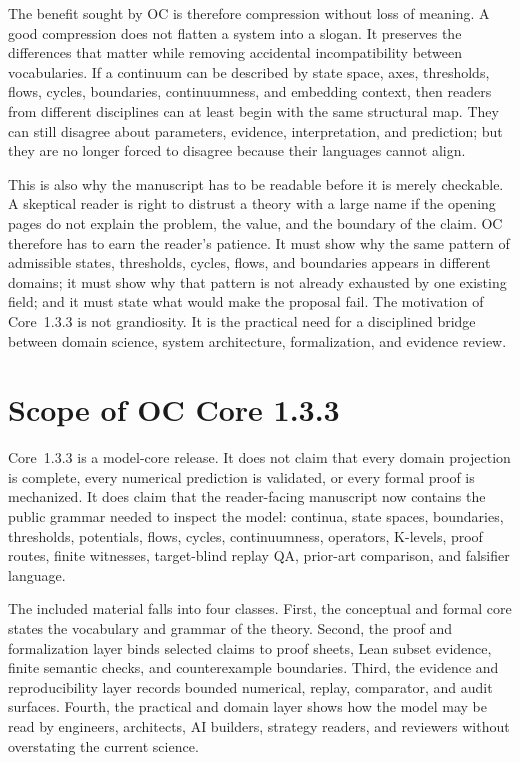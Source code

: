 The benefit sought by OC is therefore compression without loss of meaning. A
good compression does not flatten a system into a slogan. It preserves the
differences that matter while removing accidental incompatibility between
vocabularies. If a continuum can be described by state space, axes, thresholds,
flows, cycles, boundaries, continuumness, and embedding context, then readers
from different disciplines can at least begin with the same structural map.
They can still disagree about parameters, evidence, interpretation, and
prediction; but they are no longer forced to disagree because their languages
cannot align.

This is also why the manuscript has to be readable before it is merely
checkable. A skeptical reader is right to distrust a theory with a large name if
the opening pages do not explain the problem, the value, and the boundary of
the claim. OC therefore has to earn the reader's patience. It must show why the
same pattern of admissible states, thresholds, cycles, flows, and boundaries
appears in different domains; it must show why that pattern is not already
exhausted by one existing field; and it must state what would make the proposal
fail. The motivation of Core~1.3.3 is not grandiosity. It is the practical need
for a disciplined bridge between domain science, system architecture,
formalization, and evidence review.

\section{Scope of OC Core 1.3.3}
\label{sec:r008-scope}

Core~1.3.3 is a model-core release. It does not claim that every domain
projection is complete, every numerical prediction is validated, or every
formal proof is mechanized. It does claim that the reader-facing manuscript now
contains the public grammar needed to inspect the model: continua, state
spaces, boundaries, thresholds, potentials, flows, cycles, continuumness,
operators, K-levels, proof routes, finite witnesses, target-blind replay QA,
prior-art comparison, and falsifier language.

The included material falls into four classes. First, the conceptual and formal
core states the vocabulary and grammar of the theory. Second, the proof and
formalization layer binds selected claims to proof sheets, Lean subset evidence,
finite semantic checks, and counterexample boundaries. Third, the evidence and
reproducibility layer records bounded numerical, replay, comparator, and audit
surfaces. Fourth, the practical and domain layer shows how the model may be read
by engineers, architects, AI builders, strategy readers, and reviewers without
overstating the current science.

